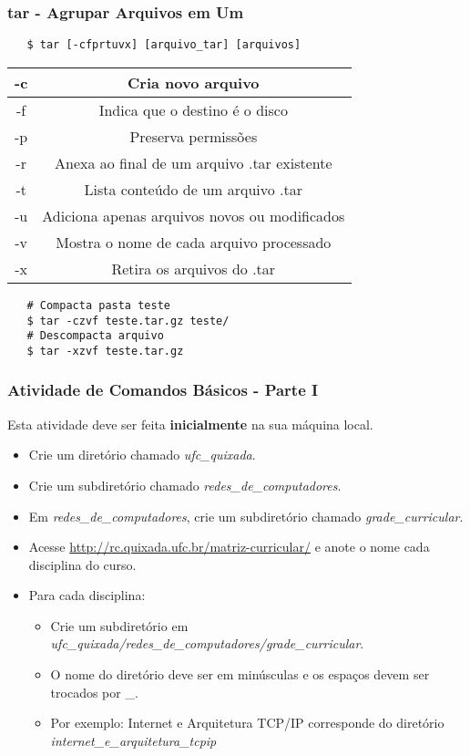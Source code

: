 \documentclass{beamer}
\begin{document}
\begin{frame}[fragile]
   \frametitle{tar - Agrupar Arquivos em Um}
   \begin{verbatim}
   $ tar [-cfprtuvx] [arquivo_tar] [arquivos]
   \end{verbatim}
   \begin{table}
      \begin{tabular}{ c | c }
         -c & Cria novo arquivo \\
         \hline 
         -f & Indica que o destino é o disco \\ 
         \hline
	 -p & Preserva permissões \\
         \hline 
         -r & Anexa ao final de um arquivo .tar existente \\ 
         \hline
         -t & Lista conteúdo de um arquivo .tar \\ 
         \hline
         -u & Adiciona apenas arquivos novos ou modificados  \\
         \hline 
         -v & Mostra o nome de cada arquivo processado \\ 
         \hline
         -x & Retira os arquivos do .tar \\ 
      \end{tabular}
   \end{table}
   \begin{verbatim}
   # Compacta pasta teste
   $ tar -czvf teste.tar.gz teste/
   # Descompacta arquivo
   $ tar -xzvf teste.tar.gz
   \end{verbatim}
\end{frame}

   \begin{frame}
      \frametitle{Atividade de Comandos Básicos - Parte I}
      Esta atividade deve ser feita \textbf{inicialmente} na sua máquina local.
      \begin{itemize}
         \item Crie um diretório chamado \textit{ufc\_quixada}.
	 \item Crie um subdiretório chamado \textit{redes\_de\_computadores}.
	 \item Em \textit{redes\_de\_computadores}, crie um subdiretório chamado \textit{grade\_curricular}.
         \item Acesse \url{http://rc.quixada.ufc.br/matriz-curricular/} e anote o nome cada disciplina do curso.
         \item Para cada disciplina:
	 \begin{itemize}
	    \item Crie um subdiretório em \textit{ufc\_quixada/redes\_de\_computadores/grade\_curricular}.
	    \item O nome do diretório deve ser em minúsculas e os espaços devem ser trocados por \_.
	    \item Por exemplo: Internet e Arquitetura TCP/IP corresponde do diretório \textit{internet\_e\_arquitetura\_tcpip}
	 \end{itemize}
      \end{itemize}
   \end{frame}
\end{document}
